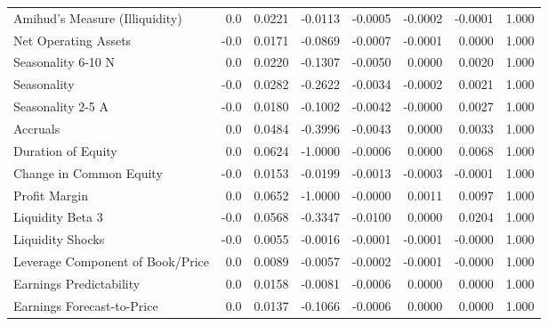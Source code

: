 \begin{tabular}{lrrrrrrr}
Amihud's Measure (Illiquidity)             &   0.0 &  0.0221 & -0.0113 & -0.0005 & -0.0002 & -0.0001 &  1.000 \\
Net Operating Assets                       &  -0.0 &  0.0171 & -0.0869 & -0.0007 & -0.0001 &  0.0000 &  1.000 \\
Seasonality 6-10 N                         &   0.0 &  0.0220 & -0.1307 & -0.0050 &  0.0000 &  0.0020 &  1.000 \\
Seasonality                                &  -0.0 &  0.0282 & -0.2622 & -0.0034 & -0.0002 &  0.0021 &  1.000 \\
Seasonality 2-5 A                          &  -0.0 &  0.0180 & -0.1002 & -0.0042 & -0.0000 &  0.0027 &  1.000 \\
Accruals                                   &   0.0 &  0.0484 & -0.3996 & -0.0043 &  0.0000 &  0.0033 &  1.000 \\
Duration of Equity                         &   0.0 &  0.0624 & -1.0000 & -0.0006 &  0.0000 &  0.0068 &  1.000 \\
Change in Common Equity                    &  -0.0 &  0.0153 & -0.0199 & -0.0013 & -0.0003 & -0.0001 &  1.000 \\
Profit Margin                              &   0.0 &  0.0652 & -1.0000 & -0.0000 &  0.0011 &  0.0097 &  1.000 \\
Liquidity Beta 3                           &  -0.0 &  0.0568 & -0.3347 & -0.0100 &  0.0000 &  0.0204 &  1.000 \\
Liquidity Shocks                           &  -0.0 &  0.0055 & -0.0016 & -0.0001 & -0.0001 & -0.0000 &  1.000 \\
Leverage Component of Book/Price           &   0.0 &  0.0089 & -0.0057 & -0.0002 & -0.0001 & -0.0000 &  1.000 \\
Earnings Predictability                    &   0.0 &  0.0158 & -0.0081 & -0.0006 &  0.0000 &  0.0000 &  1.000 \\
Earnings Forecast-to-Price                 &   0.0 &  0.0137 & -0.1066 & -0.0006 &  0.0000 &  0.0000 &  1.000 \\
\bottomrule
\end{tabular}
